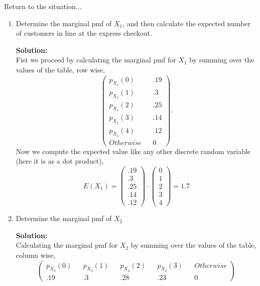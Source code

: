 \documentclass[12pt]{article}
\makeatletter
\theoremstyle{homework}
\newenvironment{exercise}[1]
{\def\@currentlabel{#1}\exercisecore}
{\endexercisecore}
\newcommand{\localhead}[1]{\par\smallskip\noindent\textbf{#1}\nobreak\\}%
\newcommand\solution{\localhead{Solution:}}
\makeatother
\begin{document}
\begin{exercise}{5.4} Return to the situation...
  \begin{enumerate}
    \item Determine the marginal pmf of $X_1$, and then calculate the  expected  number  of  customers  in  line  at  the  express checkout.
    \solution Fist we proceed by calculating the marginal pmf for $X_1$ by summing over the values of the table, row wise,
    \begin{equation*}
      \begin{pmatrix}
        p_{X_1}(0) && .19\\
        p_{X_1}(1) && .3\\
        p_{X_1}(2) && .25\\
        p_{X_1}(3) && .14\\
        p_{X_1}(4) && .12 \\
        Otherwise && 0
      \end{pmatrix}.
    \end{equation*}
Now we compute the expected value like any other discrete random variable (here it is as a dot product), 
\begin{equation*}
  E(X_1) =      
   \begin{pmatrix}
    .19\\
    .3\\
    .25\\
    .14\\
    .12
  \end{pmatrix} \cdot
  \begin{pmatrix}
    0\\
    1\\
    2\\
    3\\
    4
  \end{pmatrix} = 1.7
\end{equation*}

\vspace{.25in}

\item  Determine the marginal pmf of $X_2$\\

\solution  Calculating the marginal pmf for $X_2$ by summing over the values of the table, column wise,
\begin{equation*}
  \begin{pmatrix}
  p_{X_2}(0) && p_{X_2}(1) && p_{X_2}(2) && p_{X_2}(3) && Otherwise\\
  .19 && .3 && .28 && .23 && 0
\end{pmatrix}
\end{equation*}


\end{enumerate}
\end{exercise}
\end{document}
